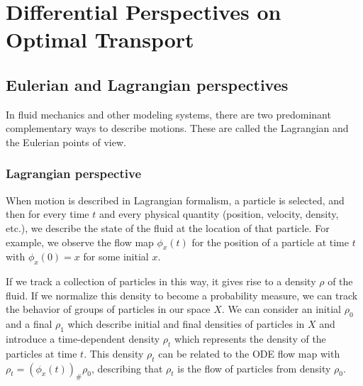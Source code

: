 \documentclass[12pt]{article}
\newcommand{\R}{\mathbb{R}}
\theoremstyle{plain}
\newtheorem{defn}{Definition}[section]
\numberwithin{equation}{section}
\begin{document}
\section{Differential Perspectives on Optimal Transport}
\subsection{Eulerian and Lagrangian perspectives}
In fluid mechanics and other modeling systems, there are two predominant complementary ways to describe motions. These are called the Lagrangian and the Eulerian points of view.
\subsubsection{Lagrangian perspective}
When motion is described in Lagrangian formalism, a particle is selected, and then for every time $t$ and every physical quantity (position, velocity, density, etc.), we describe the state of the fluid at the location of that particle. 
For example, we observe the flow map $\phi_x(t)$ for the position of a particle at time $t$ with $\phi_x(0) = x$ for some initial $x$.

If we track a collection of particles in this way, it gives rise to a density $\rho$ of the fluid. If we normalize this density to become a probability measure, we can track the behavior of groups of particles in our space $X$. We can consider an initial $\rho_0$ and a final $\rho_1$ which describe initial and final densities of particles in $X$ and introduce a time-dependent density $\rho_t$ which represents the density of the particles at time $t$. This density $\rho_t$ can be related to the ODE flow map with $\rho_t = (\phi_x(t))_\#\rho_0$, describing that $\rho_t$ is the flow of particles from density $\rho_0$.
\end{document}
